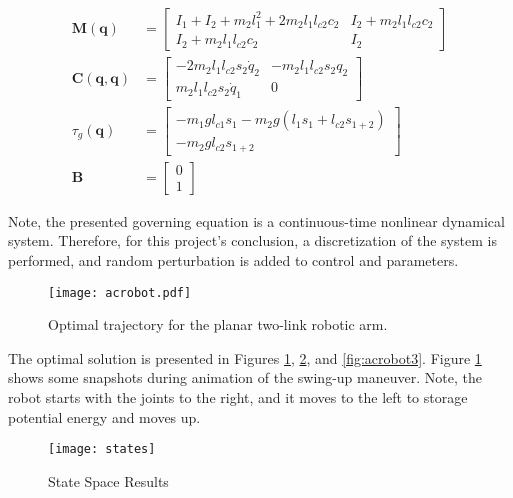 \documentclass[]{hdsr}
\begin{document}
\begin{equation}
    \begin{aligned}
    \mathbf{M}(\mathbf{q})&=\left[\begin{array}{cc}
I_{1}+I_{2}+m_{2} l_{1}^{2}+2 m_{2} l_{1} l_{c 2} c_{2} & I_{2}+m_{2} l_{1} l_{c 2} c_{2} \\
I_{2}+m_{2} l_{1} l_{c 2} c_{2} & I_{2}
\end{array}\right] \\
\mathbf{C}(\mathbf{q}, \mathbf{q})&=\left[\begin{array}{cc}
-2 m_{2} l_{1} l_{c 2} s_{2} \dot{q}_{2} & -m_{2} l_{1} l_{c 2} s_{2} q_{2} \\
m_{2} l_{1} l_{c 2} s_{2} \dot{q}_{1} & 0
\end{array}\right] \\
\tau_{g}(\mathbf{q})&=\left[\begin{array}{c}
-m_{1} g l_{c 1} s_{1}-m_{2} g\left(l_{1} s_{1}+l_{c 2} s_{1+2}\right) \\
-m_{2} g l_{c 2} s_{1+2}
\end{array}\right] \\
\mathbf{B}&=\left[\begin{array}{l}0 \\1\end{array}\right]
    \end{aligned}
\end{equation}

Note, the presented governing equation is a continuous-time nonlinear dynamical system. Therefore, for this project's conclusion, a discretization of the system is performed, and random perturbation is added to control and parameters. 

\begin{figure}[H]
\centering
\texttt{[image: acrobot.pdf]}
\caption{Optimal trajectory for the planar two-link robotic arm.}
\label{fig:acrobot1}
\end{figure}

The optimal solution is presented in Figures \ref{fig:acrobot1}, \ref{fig:acrobot2}, and \ref{fig:acrobot3}. Figure \ref{fig:acrobot1} shows some snapshots during animation of the swing-up maneuver. Note, the robot starts with the joints to the right, and it moves to the left to storage potential energy and moves up. 

\begin{figure}[H]
\centering
\texttt{[image: states]}
\caption{State Space Results}
\label{fig:acrobot2}
\end{figure}
\end{document}
